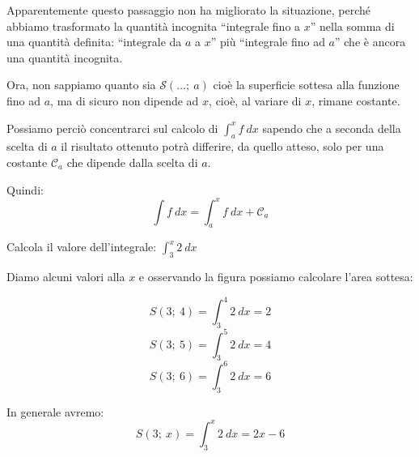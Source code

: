 Apparentemente questo passaggio non ha migliorato la situazione, perché 
abbiamo trasformato la quantità incognita ``integrale fino a \(x\)'' nella 
somma di una quantità definita: ``integrale da \(a\) a \(x\)'' più 
``integrale fino ad \(a\)'' che è ancora una quantità incognita.

\begin{minipage}{.49 \textwidth} 
Ora, non sappiamo quanto sia \(\mathcal{S}(\dots ;~a)\) cioè la superficie 
sottesa alla funzione fino ad \(a\), ma di sicuro non dipende ad \(x\), cioè, 
al variare di \(x\), rimane costante.

Possiamo perciò concentrarci sul calcolo di \(\int_{a}^x f~dx\) sapendo che a 
seconda della scelta di \(a\) il risultato ottenuto potrà differire, da 
quello atteso, solo per una costante \(\mathcal{C}_a\)
che dipende dalla scelta di \(a\).

Quindi:
\[\int f~dx = \int_{a}^x f~dx + \mathcal{C}_a\]
\end{minipage}
\hfill
\begin{minipage}{.49 \textwidth}
\begin{inaccessibleblock}[] 
  \begin{center} \intfinox \end{center}
\end{inaccessibleblock}
\end{minipage}


\begin{esempio}
Calcola il valore dell'integrale: \(\int_3^x 2~dx\)

Diamo alcuni valori alla \(x\) e osservando la figura possiamo calcolare 
l'area sottesa:

\begin{minipage}{.59 \textwidth} 
\[S(3;~4) = \int_3^4 2~dx = 2\] 
\[S(3;~5) = \int_3^5 2~dx = 4\] 
\[S(3;~6) = \int_3^6 2~dx = 6\]

In generale avremo: 
\[S(3;~x) = \int_3^x 2~dx = 2x -6\]
\end{minipage}
\hfill
\begin{minipage}{.39 \textwidth}
\begin{inaccessibleblock}[] 
  \begin{center}  \end{center}
\end{inaccessibleblock}
\end{minipage}
\end{esempio}


